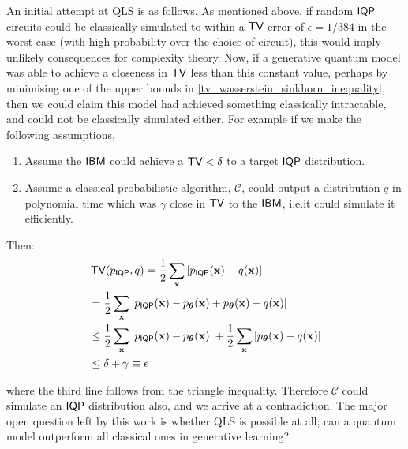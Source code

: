 An initial attempt at QLS is as follows. As mentioned above, if random $\operatorname{\textsf{IQP}}$ circuits could be classically simulated to within a $\operatorname{\textsf{TV}}$ error of $\epsilon = 1/384$\cite{bremner_average-case_2016} in the worst case (with high probability over the choice of circuit), this would imply unlikely consequences for complexity theory. Now, if a generative quantum model was able to achieve a closeness in $\operatorname{\textsf{TV}}$ less than this constant value, perhaps by minimising one of the upper bounds in \eqref{tv_wasserstein_sinkhorn_inequality}, then we could claim this model had achieved something classically intractable, and could not be classically simulated either. For example if we make the following assumptions,
\begin{enumerate}
    \item Assume the $\textsf{IBM}$ could achieve a $\operatorname{\textsf{TV}} < \delta$ to a target $\operatorname{\textsf{IQP}}$ distribution. 
    \item Assume a classical probabilistic algorithm, $\mathcal{C}$, could output a distribution $q$ in polynomial time which was $\gamma$ close in $\operatorname{\textsf{TV}}$ to the $\textsf{IBM}$, i.e.\@ it could simulate it efficiently.
\end{enumerate}
Then:
\begin{align}
&\operatorname{\textsf{TV}}(p_{\operatorname{\textsf{IQP}}}, q) = \frac{1}{2}\sum_{\mathbf{x}}|p_{\operatorname{\textsf{IQP}}}(\mathbf{x})-q(\mathbf{x})| \nonumber\\
&= \frac{1}{2}\sum_{\mathbf{x}}|p_{\operatorname{\textsf{IQP}}}(\mathbf{x}) - p_{\boldsymbol\theta}(\mathbf{x}) + p_{\boldsymbol\theta}(\mathbf{x})-q(\mathbf{x})|\nonumber\\
&\leq \frac{1}{2}\sum_{\mathbf{x}}|p_{\operatorname{\textsf{IQP}}}(\mathbf{x}) -p_{\boldsymbol\theta}(\mathbf{x})| +\frac{1}{2}\sum_{\mathbf{x}}|p_{\boldsymbol\theta}(\mathbf{x})-q(\mathbf{x})|\nonumber\\
&\leq \delta+\gamma \equiv \epsilon
\end{align}

\noindent where the third line follows from the triangle inequality. Therefore $\mathcal{C}$ could simulate an $\operatorname{\textsf{IQP}}$ distribution also, and we arrive at a contradiction. The major open question left by this work is whether QLS is possible at all; can a quantum model outperform all classical ones in generative learning?



